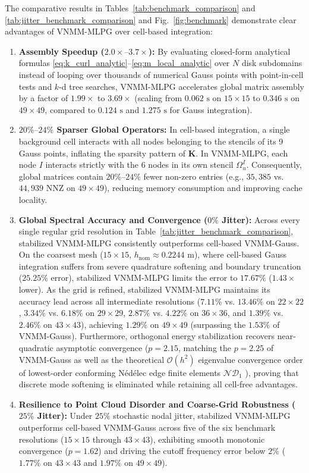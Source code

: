 \documentclass[VANCOUVER,Times1COL]{WileyNJD-v5}
\begin{document}
The comparative results in Tables~\ref{tab:benchmark_comparison} and \ref{tab:jitter_benchmark_comparison} and Fig.~\ref{fig:benchmark} demonstrate clear advantages of VNMM-MLPG over cell-based integration:
\begin{enumerate}
    \item \textbf{Assembly Speedup ($2.0\times\text{--}3.7\times$):} By evaluating closed-form analytical formulas \eqref{eq:k_curl_analytic}--\eqref{eq:m_local_analytic} over $N$ disk subdomains instead of looping over thousands of numerical Gauss points with point-in-cell tests and $k$-d tree searches, VNMM-MLPG accelerates global matrix assembly by a factor of $1.99\times$ to $3.69\times$ (scaling from $0.062\text{ s}$ on $15 \times 15$ to $0.346\text{ s}$ on $49 \times 49$, compared to $0.124\text{ s}$ and $1.275\text{ s}$ for Gauss integration).
    \item \textbf{$20\%\text{--}24\%$ Sparser Global Operators:} In cell-based integration, a single background cell interacts with all nodes belonging to the stencils of its 9 Gauss points, inflating the sparsity pattern of $\mathbf{K}$. In VNMM-MLPG, each node $I$ interacts strictly with the 6 nodes in its own stencil $\Omega_u^I$. Consequently, global matrices contain $20\%\text{--}24\%$ fewer non-zero entries (e.g., $35,385$ vs. $44,939$ NNZ on $49 \times 49$), reducing memory consumption and improving cache locality.
    \item \textbf{Global Spectral Accuracy and Convergence ($0\%$ Jitter):} Across every single regular grid resolution in Table~\ref{tab:jitter_benchmark_comparison}, stabilized VNMM-MLPG consistently outperforms cell-based VNMM-Gauss. On the coarsest mesh ($15 \times 15$, $h_{\mathrm{nom}} \approx 0.2244\text{ m}$), where cell-based Gauss integration suffers from severe quadrature softening and boundary truncation ($25.25\%$ error), stabilized VNMM-MLPG limits the error to $17.67\%$ ($1.43\times$ lower). As the grid is refined, stabilized VNMM-MLPG maintains its accuracy lead across all intermediate resolutions ($7.11\%$ vs. $13.46\%$ on $22\times 22$, $3.34\%$ vs. $6.18\%$ on $29\times 29$, $2.87\%$ vs. $4.22\%$ on $36\times 36$, and $1.39\%$ vs. $2.46\%$ on $43\times 43$), achieving $1.29\%$ on $49\times 49$ (surpassing the $1.53\%$ of VNMM-Gauss). Furthermore, orthogonal energy stabilization recovers near-quadratic asymptotic convergence ($p = 2.15$, matching the $p = 2.25$ of VNMM-Gauss as well as the theoretical $\mathcal{O}(h^2)$ eigenvalue convergence order of lowest-order conforming N\'{e}d\'{e}lec edge finite elements $\mathcal{ND}_1$ \cite{nedelec1980mixed, monk2003finite}), proving that discrete mode softening is eliminated while retaining all cell-free advantages.
    \item \textbf{Resilience to Point Cloud Disorder and Coarse-Grid Robustness ($25\%$ Jitter):} Under $25\%$ stochastic nodal jitter, stabilized VNMM-MLPG outperforms cell-based VNMM-Gauss across five of the six benchmark resolutions ($15\times 15$ through $43\times 43$), exhibiting smooth monotonic convergence ($p = 1.62$) and driving the cutoff frequency error below $2\%$ ($1.77\%$ on $43\times 43$ and $1.97\%$ on $49\times 49$). 
    

\end{enumerate}
\end{document}
